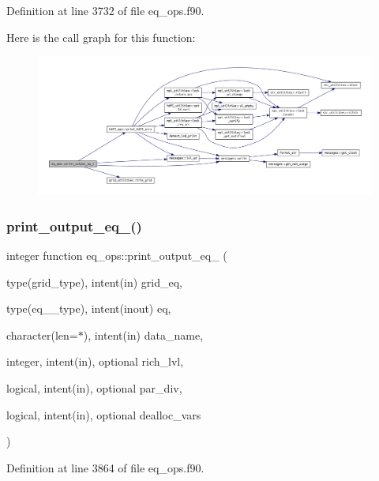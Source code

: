 Definition at line 3732 of file eq\+\_\+ops.\+f90.

Here is the call graph for this function\+:
\nopagebreak
\begin{figure}[H]
\begin{center}
\leavevmode
\includegraphics[width=350pt]{namespaceeq__ops_ad7c123990ab1ff23dbd71bb47c3181b8_cgraph}
\end{center}
\end{figure}
\mbox{\label{namespaceeq__ops_a479e914bb96e5269af860cae149e1a73}} 
\subsubsection{\texorpdfstring{print\+\_\+output\+\_\+eq\+\_()}{print\_output\_eq\_2()}}
{\footnotesize\ttfamily integer function eq\+\_\+ops\+::print\+\_\+output\+\_\+eq\+\_ (\begin{DoxyParamCaption}\item[{type(grid\+\_\+type), intent(in)}]{grid\+\_\+eq,  }\item[{type(eq\+\_\+2\+\_\+type), intent(inout)}]{eq,  }\item[{character(len=$\ast$), intent(in)}]{data\+\_\+name,  }\item[{integer, intent(in), optional}]{rich\+\_\+lvl,  }\item[{logical, intent(in), optional}]{par\+\_\+div,  }\item[{logical, intent(in), optional}]{dealloc\+\_\+vars }\end{DoxyParamCaption})}



Definition at line 3864 of file eq\+\_\+ops.\+f90.

